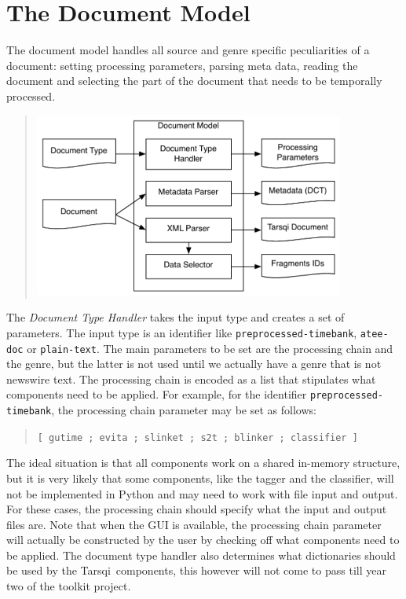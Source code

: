 \documentclass[11pt]{article}
\newcommand{\tarsqi}{T{\sc arsqi}}
\begin{document}
\section{The Document Model}

The document model handles all source and genre specific peculiarities of a document: setting processing parameters, parsing meta data, reading the document and selecting the part of the document that needs to be temporally processed.

\begin{quote}
\includegraphics[width=4in]{images/architecture2.pdf} 
\end{quote}

The {\em Document Type Handler} takes the input type and creates a set of parameters. The input type is an identifier like {\tt preprocessed-timebank}, {\tt atee-doc} or {\tt plain-text}. The main parameters to be set are the processing chain and the genre, but the latter is not used until we actually have a genre that is not newswire text. The processing chain is encoded as a list that stipulates what components need to be applied. For example, for the identifier {\tt preprocessed-timebank}, the processing chain parameter may be set as follows:

\begin{quote}
{\tt [ gutime ; evita ; slinket ; s2t ; blinker ; classifier ]}
\end{quote}

The ideal situation is that all components work on a shared in-memory structure, but it is very likely that some components, like the tagger and the classifier, will not be implemented in Python and may need to work with file input and output. For these cases, the processing chain should specify what the input and output files are. Note that when the GUI is available, the processing chain parameter will actually be constructed by the user by checking off what components need to be applied. The document type handler also determines what dictionaries should be used by the \tarsqi\ components, this however will not come to pass till year two of the toolkit project.
\end{document}
